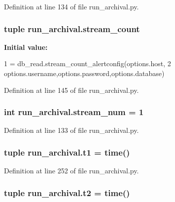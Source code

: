 Definition at line 134 of file run\-\_\-archival.\-py.

\hypertarget{namespacerun__archival_a1aa2ba0984af9e6525f66fb7d1f912d5}{
\subsubsection[{stream\-\_\-count}]{\setlength{\rightskip}{0pt plus 5cm}tuple run\-\_\-archival.\-stream\-\_\-count}}\label{namespacerun__archival_a1aa2ba0984af9e6525f66fb7d1f912d5}
{\bfseries Initial value\-:}
\begin{DoxyCode}
1 = db\_read.stream\_count\_alertconfig(options.host,
2                           options.username,options.password,options.database)
\end{DoxyCode}


Definition at line 145 of file run\-\_\-archival.\-py.

\hypertarget{namespacerun__archival_a5a97b1e71d6ad7513865ee536b7b4dea}{
\subsubsection[{stream\-\_\-num}]{\setlength{\rightskip}{0pt plus 5cm}int run\-\_\-archival.\-stream\-\_\-num = 1}}\label{namespacerun__archival_a5a97b1e71d6ad7513865ee536b7b4dea}


Definition at line 133 of file run\-\_\-archival.\-py.

\hypertarget{namespacerun__archival_ae4106daf64be22b10853a0d056069368}{
\subsubsection[{t1}]{\setlength{\rightskip}{0pt plus 5cm}tuple run\-\_\-archival.\-t1 = time()}}\label{namespacerun__archival_ae4106daf64be22b10853a0d056069368}


Definition at line 252 of file run\-\_\-archival.\-py.

\hypertarget{namespacerun__archival_a2179a933281124091cdc32bed8a04c7f}{
\subsubsection[{t2}]{\setlength{\rightskip}{0pt plus 5cm}tuple run\-\_\-archival.\-t2 = time()}}\label{namespacerun__archival_a2179a933281124091cdc32bed8a04c7f}



